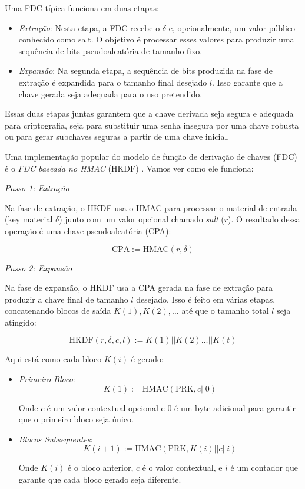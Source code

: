 Uma FDC típica funciona em duas etapas:
\begin{itemize}
\item[] {\em Extração}:
  Nesta etapa, a FDC recebe o $\delta$ e, opcionalmente, um valor público conhecido como salt.
  O objetivo é processar esses valores para produzir uma sequência de bits pseudoaleatória de tamanho fixo.
\item[] {\em Expansão}:
  Na segunda etapa, a sequência de bits produzida na fase de extração é expandida para o tamanho final desejado $l$.
  Isso garante que a chave gerada seja adequada para o uso pretendido.
\end{itemize}

Essas duas etapas juntas garantem que a chave derivada seja segura e adequada para criptografia, seja para substituir uma senha insegura por uma chave robusta ou para gerar subchaves seguras a partir de uma chave inicial.

Uma implementação popular do modelo de função de derivação de chaves (FDC) é o {\em FDC baseada no HMAC} (HKDF) \cite{Krawczyk10}.
Vamos ver como ele funciona:

{\em Passo 1: Extração}

Na fase de extração, o HKDF usa o HMAC para processar o material de entrada (key material $\delta$) junto com um valor opcional chamado {\em salt} ($r$).
O resultado dessa operação é uma chave pseudoaleatória (CPA):

\begin{displaymath}
\text{CPA} := \text{HMAC}(r, \delta)
\end{displaymath}

{\em Passo 2: Expansão}

Na fase de expansão, o HKDF usa a CPA gerada na fase de extração para produzir a chave final de tamanho $l$ desejado.
Isso é feito em várias etapas, concatenando blocos de saída $K(1), K(2), \dots$ até que o tamanho total $l$ seja atingido:

\begin{displaymath}
\text{HKDF}(r, \delta, c, l) := K(1) || K(2) \dots || K(t)
\end{displaymath}

Aqui está como cada bloco $K(i)$ é gerado:

\begin{itemize}
    \item {\em Primeiro Bloco}:
    \begin{displaymath}
      K(1) := \text{HMAC}(\text{PRK}, c || 0)
    \end{displaymath}

    Onde $c$ é um valor contextual opcional e 0 é um byte adicional para garantir que o primeiro bloco seja único.

    \item {\em Blocos Subsequentes}:
    \begin{displaymath}
    K(i + 1) := \text{HMAC}(\text{PRK}, K(i) || c || i)
    \end{displaymath}
    
    Onde $K(i)$ é o bloco anterior, $c$ é o valor contextual, e $i$ é um contador que garante que cada bloco gerado seja diferente.
\end{itemize}

